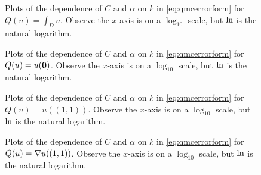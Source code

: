 \begin{figure}[h]
    \centering
    \begin{subfigure}{\textwidth}
      \centering

    \end{subfigure}
    \begin{subfigure}{\textwidth}
                \centering
      
    \end{subfigure}
\caption{Plots of the dependence of $C$ and $\alpha$ on $k$ in \cref{eq:qmcerrorform} for $Q(u) = \int_D u$. Observe the $x$-axis is on a $\log_{10}$ scale, but $\operatorname{ln}$ is the natural logarithm. \label{fig:integralCalpha}}
\end{figure}
\begin{figure}[h]
    \centering
    \begin{subfigure}{\textwidth}
            \centering

  \end{subfigure}
    \begin{subfigure}{\textwidth}
                \centering

    \end{subfigure}

\caption{Plots of the dependence of $C$ and $\alpha$ on $k$ in \cref{eq:qmcerrorform} for $Q(u) =  u(\mathbf{0})$. Observe the $x$-axis is on a $\log_{10}$ scale, but $\operatorname{ln}$ is the natural logarithm. \label{fig:originCalpha}}
\end{figure}

\begin{figure}[h]
    \centering
    \begin{subfigure}{\textwidth}
            \centering

  \end{subfigure}
    \begin{subfigure}{\textwidth}
            \centering

    \end{subfigure}
\caption{Plots of the dependence of $C$ and $\alpha$ on $k$ in \cref{eq:qmcerrorform} for $Q(u) = u((1,1))$. Observe the $x$-axis is on a $\log_{10}$ scale, but $\operatorname{ln}$ is the natural logarithm.  \label{fig:toprightCalpha}}
\end{figure}

\begin{figure}[h]
    \centering
    \begin{subfigure}{\textwidth}
            \centering

  \end{subfigure}
    \begin{subfigure}{\textwidth}
            \centering 

    \end{subfigure}
\caption{Plots of the dependence of $C$ and $\alpha$ on $k$ in \cref{eq:qmcerrorform} for $Q(u) = \nabla u((1,1))$. Observe the $x$-axis is on a $\log_{10}$ scale, but $\operatorname{ln}$ is the natural logarithm.  \label{fig:gradienttoprightCalpha}}
\end{figure}


